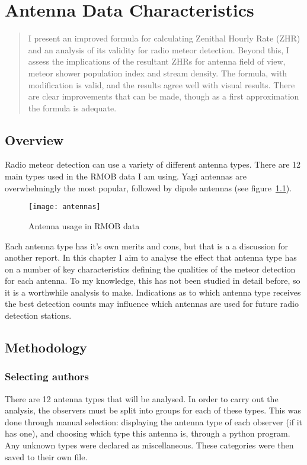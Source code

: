 \chapter{Antenna Data Characteristics}
\label{chap:antenna}
\begin{strip}
	\begin{minipage}{\textwidth}
		\begin{abstract}
			I present an improved formula for calculating Zenithal Hourly Rate (ZHR) and an analysis of its validity for radio meteor detection. Beyond this, I assess the implications of the resultant ZHRs for antenna field of view, meteor shower population index and stream density. The formula, with modification is valid, and the results agree well with visual results. There are clear improvements that can be made, though as a first approximation the formula is adequate.
		\end{abstract}
	\end{minipage}
\end{strip}
\section{Overview}
Radio meteor detection can use a variety of different antenna types. There are 12 main types used in the RMOB data I am using. Yagi antennas are overwhelmingly the most popular, followed by dipole antennas (see figure~\ref{fig:antennas}).
\begin{figure}[h!]
	\centering
	\texttt{[image: antennas]}
	\caption{Antenna usage in RMOB data \label{fig:antennas}}
\end{figure}
Each antenna type has it's own merits and cons, but that is a a discussion for another report. In this chapter I aim to analyse the effect that antenna type has on a number of key characteristics defining the qualities of the meteor detection for each antenna. To my knowledge, this has not been studied in detail before, so it is a worthwhile analysis to make. Indications as to which antenna type receives the best detection counts may influence which antennas are used for future radio detection stations.
\section{Methodology}
\subsection{Selecting authors}
There are 12 antenna types that will be analysed. In order to carry out the analysis, the observers must be split into groups for each of these types. This was done through  manual selection: displaying the antenna type of each observer (if it has one), and choosing which type this antenna is, through a python program. Any unknown types were declared as miscellaneous. These categories were then saved to their own file.
